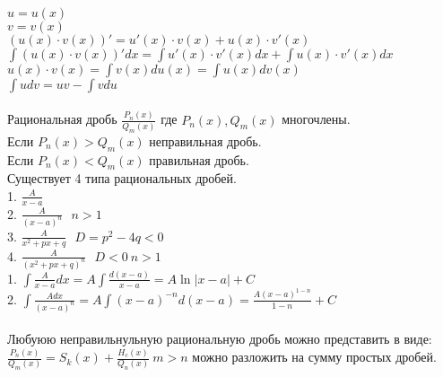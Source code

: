 \\
$u = u(x)$\\
$v = v(x)$\\
$(u(x)\cdot v(x))' = u'(x)\cdot v(x) + u(x)\cdot v'(x)$\\
$\int(u(x)\cdot v(x))'dx = \int u'(x)\cdot v'(x)dx + \int u(x)\cdot v'(x)dx$\\
$u(x)\cdot v(x) = \int v(x)du(x) = \int u(x)dv(x)$\\
$\int udv = uv - \int vdu$\\

\\
Рациональная дробь $\frac{P_n(x)}{Q_m(x)}$ где $P_n(x), Q_m(x)$ многочлены.\\
Если $P_n(x) > Q_m(x)$ неправильная дробь.\\
Если $P_n(x) < Q_m(x)$ правильная дробь.\\

Существует 4 типа рациональных дробей.\\
1. $\frac{A}{x-a}$\\
2. $\frac{A}{(x-a)^n} ~~~ n > 1$\\
3. $\frac{A}{x^2 + px +q} ~~~ D = p^2 - 4q < 0$\\
4. $\frac{A}{(x^2 + px +q)^n} ~~~ D < 0 ~ n > 1$\\

1. $\int \frac{A}{x-a}dx = A\int \frac{d(x-a)}{x-a} = A\ln|x-a| + C$\\
2. $\int \frac{Adx}{(x-a)^n} = A\int (x-a)^{-n}d(x-a) 
= \frac{A(x-a)^{1-n}}{1-n} + C$\\

\\
Любуюю неправильнульную рациональную дробь можно представить в виде:\\
$\frac{P_n(x)}{Q_m(x)} = S_k(x) + \frac{H_c(x)}{Q_n(x)} ~ m>n$ можно разложить
на сумму простых дробей.\\
 
